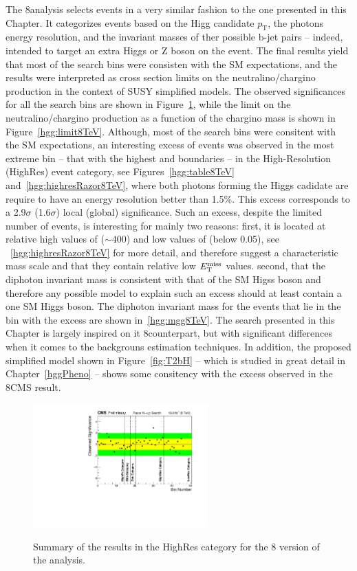 The 8\TeV analysis selects events in a very similar fashion to the one
presented in this Chapter. It categorizes events based on the Higg
candidate $p_{\mathrm{T}}$, the photons energy resolution, and the
invariant masses of ther possible b-jet pairs -- indeed, intended to
target an extra Higgs or Z boson on the event. The final results yield
that most of the search bins were consisten with the SM expectations,
and the results were interpreted as cross section limits on the
neutralino/chargino production in the context of SUSY simplified
models. The observed significances for all the search bins are shown
in Figure~\ref{hgg:significance8TeV}, while the limit on the
neutralino/chargino production as a function of the chargino mass is
shown in Figure~\ref{hgg:limit8TeV}. Although, most of the search bins
were consitent with the SM expectations, an interesting excess of
events was observed in the most extreme bin -- that with the highest
\MR and \Rtwo boundaries -- in the High-Resolution (HighRes) event
category, see Figures~\ref{hgg:table8TeV} and~\ref{hgg:highresRazor8TeV}, where both photons forming
the Higgs cadidate are require to have an energy resolution better
than 1.5\%. This excess corresponds to a 2.9$\sigma$ (1.6$\sigma$)
local (global) significance. Such an excess, despite the limited
number of events, is interesting for mainly two reasons: first, it is located at relative
high values of \MR ($\sim 400$\GeV) and low values of \Rtwo (below
0.05), see ~\ref{hgg:highresRazor8TeV} for more detail, and therefore
suggest a characteristic mass scale and that they contain relative low
$E_{\mathrm{T}}^{\text{miss}}$ values. second, that the diphoton invariant mass is
consistent with that of the SM Higss boson and therefore any possible
model to explain such an excess should at least contain a one SM Higgs
boson. The diphoton invariant mass for the events that lie in the bin
with the excess are shown in~\ref{hgg:mgg8TeV}. The search presented
in this Chapter is largely inspired on it 8\TeV counterpart, but with
significant differences when it comes to the backgrouns estimation
techniques. In addition, the proposed simplified model shown
in Figure~\ref{fig:T2bH} -- which is studied in great detail in
Chapter~\ref{hggPheno} -- shows some consitency with the excess
observed in the 8\TeV CMS result.
\begin{figure}[ht!]
\centering
\includegraphics[width=0.6\textwidth,angle=0.]{hgg/SignificanceVsBin_8TeV.pdf}\\
\caption{Summary of the  results in the HighRes category for the 8\TeV
  version of the analysis.
       \label{hgg:significance8TeV}}
\end{figure}

